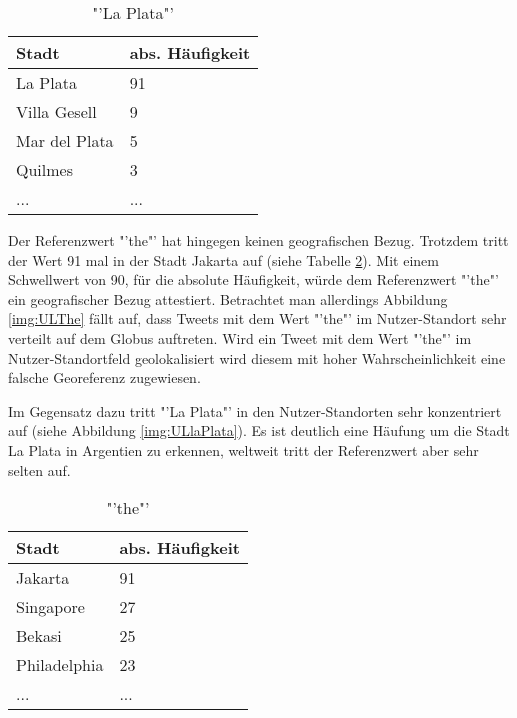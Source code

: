 			\begin{table}[h]
				\centering
				\caption{"'La Plata"'}
				\label{tab:laPlataAbs}
				\begin{tabular}{|l|l|}
				\hline
				Stadt            & abs. Häufigkeit  \\ \hline \hline
				La Plata         & 91              \\ \hline
				Villa Gesell     & 9               \\ \hline
				Mar del Plata    & 5               \\ \hline
				Quilmes          & 3               \\ \hline
				... & ... \\ \hline
				\end{tabular}
			\end{table}

			Der Referenzwert "'the"' hat hingegen keinen geografischen Bezug.
			Trotzdem tritt der Wert 91 mal in der Stadt Jakarta auf (siehe Tabelle \ref{tab:theAbs}). 
			Mit einem Schwellwert von 90, für die absolute Häufigkeit, würde dem Referenzwert "'the"' ein geografischer Bezug attestiert.
			Betrachtet man allerdings Abbildung \ref{img:ULThe} fällt auf, dass Tweets mit dem Wert "'the"' im Nutzer-Standort sehr verteilt auf dem Globus auftreten.
			Wird ein Tweet mit dem Wert "'the"' im Nutzer-Standortfeld geolokalisiert wird diesem mit hoher Wahrscheinlichkeit eine falsche Georeferenz zugewiesen.

			Im Gegensatz dazu tritt "'La Plata"' in den Nutzer-Standorten sehr konzentriert auf (siehe Abbildung \ref{img:ULlaPlata}).
			Es ist deutlich eine Häufung um die Stadt La Plata in Argentien zu erkennen, weltweit tritt der Referenzwert aber sehr selten auf.

			\begin{table}[h]
				\centering
				\caption{"'the"'}
				\label{tab:theAbs}
				\begin{tabular}{|l|l|}
				\hline
				Stadt             & abs. Häufigkeit \\ \hline \hline
				Jakarta           & 91              \\ \hline
				Singapore         & 27              \\ \hline
				Bekasi            & 25              \\ \hline
				Philadelphia      & 23              \\ \hline
				... & ... \\ \hline
				\end{tabular}
				\end{table}

